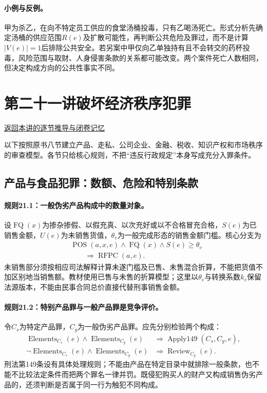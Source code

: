 \paragraph{小例与反例。}
甲为杀乙，在向不特定员工供应的食堂汤桶投毒，只有乙喝汤死亡。形式分析先确定汤桶的供应范围$R(e)$及扩散可能性，再判断公共危险及罪过，而不是计算$|V(e)|=1$后排除公共安全。若另案中甲仅向乙单独持有且不会转交的药杯投毒，风险范围与取财、人身侵害条款的关系都可能改变。两个案件死亡人数相同，但决定构成方向的公共性事实不同。

\section{第二十一讲\quad 破坏经济秩序犯罪}

\label{ref:lecture:21}

\noindent\hyperref[lecture:21]{返回本讲的逐节推导与闭卷记忆}

以下按照原书八节建立产品、走私、公司企业、金融、税收、知识产权和市场秩序的审查模型。各节只给核心规则，不把“违反行政规定”本身写成充分入罪条件。

\subsection{产品与食品犯罪：数额、危险和特别条款}
\paragraph{规则21.1：一般伪劣产品构成中的数量对象。}
设$\operatorname{FQ}(x)$为掺杂掺假、以假充真、以次充好或以不合格冒充合格，$S(e)$为已销售金额，$U(e)$为未销售货值，$\theta_v$为一般完成形态的销售金额门槛。核心分支为
\[
\begin{aligned}
&\operatorname{POS}(a,x,e)\land\operatorname{FQ}(x)
\land S(e)\geq\theta_v\\
&\qquad\Rightarrow\operatorname{RFPC}(a,e).
\end{aligned}
\]
未销售部分须按相应司法解释计算未遂门槛及已售、未售混合折算，不能把货值不加区别地当销售额。教材使用已售与未售的折算模型；这里以$\theta_v$与转换系数$k_v$保留法源版本，不能由民事合同总价直接代替刑事销售金额。

\paragraph{规则21.2：特别产品罪与一般产品罪是竞争评价。}
令$C_s$为特定产品罪，$C_g$为一般伪劣产品罪。应先分别检验两个构成：
\[
\begin{aligned}
\operatorname{Elements}_{C_s}(e)\land\operatorname{Elements}_{C_g}(e)
&\Rightarrow\operatorname{Apply149}(C_s,C_g,e),\\
\neg\operatorname{Elements}_{C_s}(e)\land\operatorname{Elements}_{C_g}(e)
&\Rightarrow\operatorname{Review}_{C_g}(e).
\end{aligned}
\]
刑法第149条设有具体处理规则；不能由产品在特定目录中就排除一般条款，也不能不比较法定条件而把两个罪名一律并罚。既侵犯购买人的财产又构成销售伪劣产品的，还须判断是否属于同一行为触犯不同构成。

